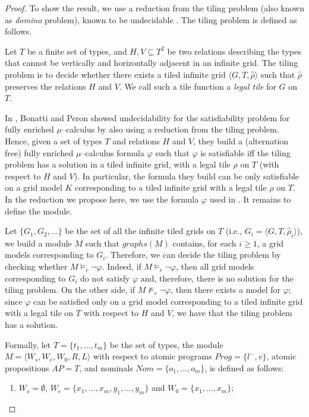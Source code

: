 \documentclass{LMCS}
\theoremstyle{plain}
\newcommand \tpl[1] {\langle #1 \rangle}
\begin{document}
\begin{proof}
To show the result, we use a reduction from the tiling problem (also known as
\emph{domino} problem), known to be undecidable \cite{Ber66}. The tiling
problem is defined as follows.

Let $T$ be a finite set of types, and $H,V \subseteq T^2$ be two relations
describing the types that cannot be vertically and horizontally adjacent in an
infinite grid. The tiling problem is to decide whether there exists a tiled
infinite grid $\tpl{G,T,\hat{\rho}}$ such that $\hat{\rho}$ preserves the
relations $H$ and $V$. We call such a tile function a \emph{legal tile} for $G$
on $T$.

In \cite{BP04}, Bonatti and Peron showed undecidability for the satisfiability
problem for fully enriched $\mu$--calculus by also using a reduction from the
tiling problem. Hence, given a set of types $T$ and relations $H$ and $V$, they
build a (alternation free) fully enriched $\mu$--calculus formula $\varphi$
such that $\varphi$ is satisfiable iff the tiling problem has a solution in a
tiled infinite grid, with a legal tile $\rho$ on $T$ (with respect to $H$ and
$V$). In particular, the formula they build can be only satisfiable on a grid
model $K$ corresponding to a tiled infinite grid with a legal tile $\rho$ on
$T$. In the reduction we propose here, we use the formula $\varphi$ used in
\cite{BP04}. It remains to define the module.

Let $\{G_1, G_2, \ldots\}$ be the set of all the infinite tiled grids on $T$
(i.e., $G_i = \tpl{G,T,\hat{\rho}_i}$), we build a module $M$ such that
$graphs(M)$ contains, for each $i\geq 1$, a grid models corresponding to $G_i$.
Therefore, we can decide the tiling problem by checking whether $M \models_r
\neg\varphi$. Indeed, if $M \models_r \neg\varphi$, then all grid models
corresponding to $G_i$ do not satisfy $\varphi$ and, therefore, there is no
solution for the tiling problem. On the other side, if $M \not\models_r
\neg\varphi$, then there exists a model for $\varphi$; since $\varphi$ can be
satisfied only on a grid model corresponding to a tiled infinite grid with a
legal tile on $T$ with respect to $H$ and $V$, we have that the tiling problem
has a solution.

Formally, let $T=\{t_1, \ldots, t_m\}$ be the set of types, the module $M =
\tpl{W_s,W_e, \allowbreak W_0,R,L}$ with respect to atomic programs $Prog =
\{l^-,v\}$, atomic propositions $AP = T$, and nominals $Nom = \{o_1, \ldots,
o_m\}$, is defined as follows:
\begin{enumerate}[$\bullet$]
\item
$W_s = \emptyset$, $W_e = \{x_1, \ldots, x_m, y_1, \ldots, y_m\}$
and $W_0 = \{x_1, \ldots, x_m\}$;


\end{enumerate}
\end{proof}
\end{document}
